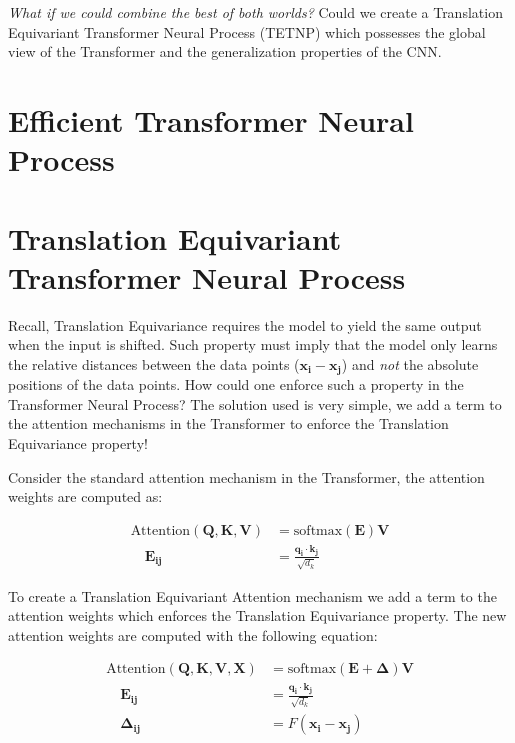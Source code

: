 \documentclass[../../main.tex]{subfiles}
\begin{document}
\emph{What if we could combine the best of both worlds?} Could we create a Translation Equivariant Transformer Neural Process (TETNP) which possesses the global view of the Transformer and the generalization properties of the CNN.


\section{Efficient Transformer Neural Process}



\section{Translation Equivariant Transformer Neural Process}
\label{sec:tetnp}

Recall, Translation Equivariance requires the model to yield the same output when the input is shifted. Such property must imply that the model only learns the relative distances between the data points ($\bm{x_i} - \bm{x_j}$) and \emph{not} the absolute positions of the data points. How could one enforce such a property in the Transformer Neural Process? The solution used is very simple, we add a term to the attention mechanisms in the Transformer to enforce the Translation Equivariance property!

Consider the standard attention mechanism in the Transformer, the attention weights are computed as:


\begin{align}
	\text{Attention}(\bm{Q}, \bm{K}, \bm{V}) &= \text{softmax}\left(\bm{E} \right) \bm{V}\\
	 \quad \bm{E_{ij}} &= \frac{\bm{q_i} \cdot \bm{k_j}}{\sqrt{d_k}}
\end{align}

To create a Translation Equivariant Attention mechanism we add a term to the attention weights which enforces the Translation Equivariance property. The new attention weights are computed with the following equation:

\begin{align}
	\text{Attention}(\bm{Q}, \bm{K}, \bm{V}, \bm{X}) &= \text{softmax}\left(\bm{E} + \bm{\Delta} \right) \bm{V}\\
	\quad \bm{E_{ij}} &= \frac{\bm{q_i} \cdot \bm{k_j}}{\sqrt{d_k}}\\
	 \quad \bm{\Delta_{ij}} &= F(\bm{x_i} - \bm{x_j})
\end{align}
\end{document}
